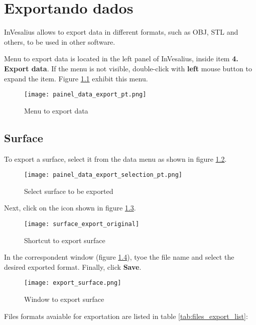 \chapter{Exportando dados}

InVesalius allows to export data in different formats, such as OBJ, STL and others, to be used in other software.

Menu to export data is located in the left panel of InVesalius,
inside item \textbf{4. Export data}. If the menu is not visible, double-click with \textbf{left} mouse button
to expand the item. Figure \ref{fig:data_export} exhibit this menu.

\begin{figure}[!htb]
\centering
\texttt{[image: painel\_data\_export\_pt.png]}
\caption{Menu to export data}
\label{fig:data_export}
\end{figure}

\section{Surface}

To export a surface, select it from the data menu as shown in
figure \ref{fig:data_export_selection}.

\newpage

\begin{figure}[!htb]
\centering
\texttt{[image: painel\_data\_export\_selection\_pt.png]}
\caption{Select surface to be exported}
\label{fig:data_export_selection}
\end{figure}

Next, click on the icon shown in figure \ref{fig:surface_export_original}.

\begin{figure}[!htb]
\centering
\texttt{[image: surface\_export\_original]}
\caption{Shortcut to export surface}
\label{fig:surface_export_original}
\end{figure}

In the correspondent window (figure \ref{fig:export_data_window}), tyoe the file name and
select the desired exported format. Finally, click \textbf{Save}.


\begin{figure}[!htb]
\centering
\texttt{[image: export\_surface.png]}
\caption{Window to export surface}
\label{fig:export_data_window}
\end{figure}

Files formats avaiable for exportation are listed in table
\ref{tab:files_export_list}:

